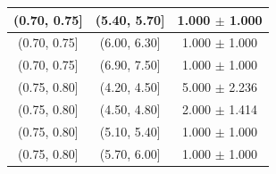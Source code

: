 \begin{longtable}{|c|c|c|}
\hline
(0.70, 0.75] & (5.40, 5.70] & 1.000 $\pm$ 1.000 \\ 
\hline
(0.70, 0.75] & (6.00, 6.30] & 1.000 $\pm$ 1.000 \\ 
\hline
(0.70, 0.75] & (6.90, 7.50] & 1.000 $\pm$ 1.000 \\ 
\hline
(0.75, 0.80] & (4.20, 4.50] & 5.000 $\pm$ 2.236 \\ 
\hline
(0.75, 0.80] & (4.50, 4.80] & 2.000 $\pm$ 1.414 \\ 
\hline
(0.75, 0.80] & (5.10, 5.40] & 1.000 $\pm$ 1.000 \\ 
\hline
(0.75, 0.80] & (5.70, 6.00] & 1.000 $\pm$ 1.000 \\ 
\hline
\end{longtable}
